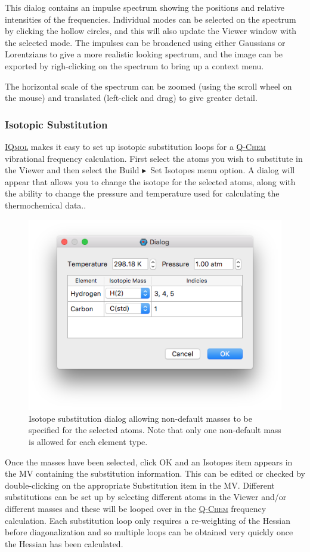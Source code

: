 \documentclass[a4paper,12pt]{article}
\newcommand{\qchem}{\href{https://q-chem.com}{{\scshape Q-Chem}}}
\newcommand{\iqmol}{\href{https://www.iqmol.org}{{\scshape IQmol}}}
\newcommand{\bt}{\ensuremath{\blacktriangleright}}
\begin{document}
This dialog contains an impulse spectrum showing the positions and relative
intensities of the frequencies.  Individual modes can be selected on the
spectrum by clicking the hollow circles, and this will also update the Viewer
window with the selected mode.  The impulses can be broadened using either
Gaussians or Lorentzians to give a more realistic looking spectrum, and the
image can be exported by righ-clicking on the spectrum to bring up a context
menu.

The horizontal scale of the spectrum can be zoomed (using the scroll wheel on
the mouse) and translated (left-click and drag) to give greater detail.

\subsubsection{Isotopic Substitution}

\iqmol{} makes it easy to set up isotopic substitution loops for a \qchem{}
vibrational frequency calculation.  First select the atoms  you wish to
substitute in the Viewer and then select the Build \bt\ Set Isotopes menu option.
A dialog will appear that allows you to change the isotope for the selected atoms,
along with the ability to change the pressure and temperature used for calculating
the thermochemical data..  
\begin{figure}[h]
\begin{center}
\includegraphics[scale=0.20]{figures/IsotopeDialog.png}
\caption{Isotope substitution dialog allowing non-default masses to be
specified for the selected atoms.  Note that only one non-default mass is
allowed for each element type.}
\end{center}
\end{figure}
Once the masses have been selected, click OK and an Isotopes item appears in
the MV containing the substitution information.  This can be edited or checked
by double-clicking on the appropriate Substitution item in the MV.  Different
substitutions can be set up by selecting different atoms in the Viewer and/or
different masses and these will be looped over in the \qchem{} frequency
calculation.  Each substitution loop only requires a re-weighting of the
Hessian before diagonalization and so multiple loops can be obtained very
quickly once the Hessian has been calculated.
\end{document}
